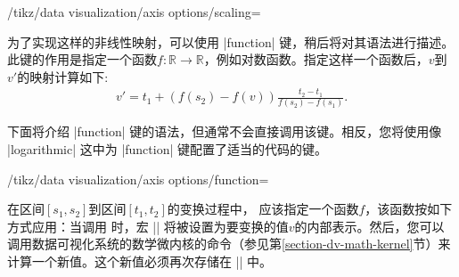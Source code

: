 \begin{key}{/tikz/data visualization/axis options/scaling=}

    为了实现这样的非线性映射，可以使用 |function| 键，稍后将对其语法进行描述。此键的作用是指定一个函数$f \colon \mathbb{R} \to \mathbb{R}$，例如对数函数。指定这样一个函数后，$v$到$v'$的映射计算如下:
    \begin{align*}
        v' = t_1 + (f(s_2) - f(v))\frac{t_2 - t_1}{f(s_2)-f(s_1)}.
    \end{align*}


    下面将介绍 |function| 键的语法，但通常不会直接调用该键。相反，您将使用像 |logarithmic| 这中为 |function| 键配置了适当的代码的键。
    \begin{key}{/tikz/data visualization/axis options/function=} %

        在区间$[s_1,s_2]$到区间$[t_1,t_2]$的变换过程中， 应该指定一个函数$f$，该函数按如下方式应用：当调用  时，宏 |\pgfvalue| 将被设置为要变换的值$v$的内部表示。然后，您可以调用数据可视化系统的数学微内核的命令（参见第\ref{section-dv-math-kernel}节）来计算一个新值。这个新值必须再次存储在 |\pgfvalue| 中。



\end{key}
\end{key}
